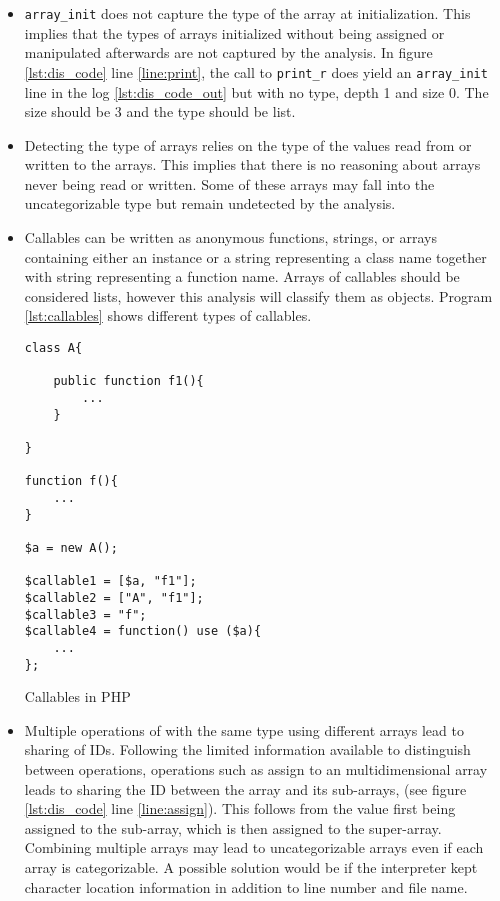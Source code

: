 \begin{itemize}
\item  \texttt{array\_init} does not capture the type of the array at initialization. This implies that the types of arrays initialized without being assigned or manipulated afterwards are not captured by the analysis. In figure \ref{lst:dis_code} line \ref{line:print}, the call to \texttt{print\_r} does yield an \texttt{array\_init} line in the log \ref{lst:dis_code_out} but with no type, depth 1 and size 0. The size should be 3 and the type should be list.

\item Detecting the type of arrays relies on the type of the values read from or written to the arrays. This implies that there is no reasoning about arrays never being read or written. Some of these arrays may fall into the uncategorizable type but remain undetected by the analysis.

\item Callables can be written as anonymous functions, strings, or arrays containing either an instance or a string representing a class name together with string representing a function name. Arrays of callables should be considered lists, however this analysis will classify them as objects. Program \ref{lst:callables} shows different types of callables.

\begin{program}
\centering
\begin{lstlisting}
class A{

    public function f1(){
        ...
    }

}

function f(){
    ...
}

$a = new A();

$callable1 = [$a, "f1"];
$callable2 = ["A", "f1"];
$callable3 = "f";
$callable4 = function() use ($a){
    ...
};
\end{lstlisting}
\caption{Callables in PHP}
\label{lst:callables}
\end{program}

\item Multiple operations of with the same type using different arrays lead to sharing of IDs. Following the limited information available to distinguish between operations, operations such as assign to an multidimensional array leads to sharing the ID between the array and its sub-arrays, (see figure \ref{lst:dis_code} line \ref{line:assign}). This follows from the value first being assigned to the sub-array, which is then assigned to the super-array. Combining multiple arrays may lead to uncategorizable arrays even if each array is categorizable. A possible solution would be if the interpreter kept character location information in addition to line number and file name.   

\end{itemize}




